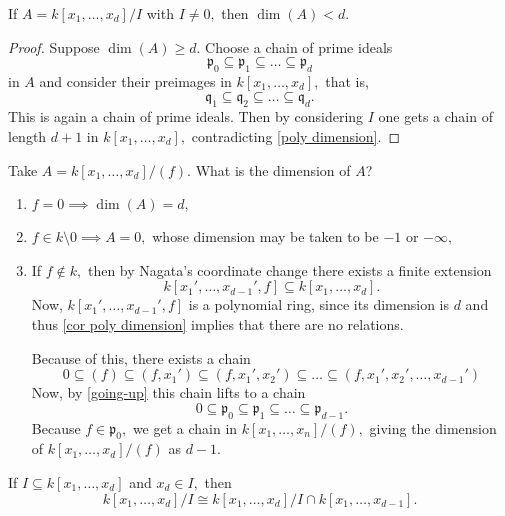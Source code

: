 \begin{corollary}
  \label{cor poly dimension}
  If
  \(A = k[x_1, \dotsc, x_d] /{I}\)
  with
  \(I \neq 0,\)
  then
  \(\dim(A) < d.\)
\end{corollary}
\begin{proof}
  Suppose
  \(\dim(A) \geq d.\)
  Choose a chain of prime ideals
  \[\mathfrak p_0 \subseteq \mathfrak p_1 \subseteq \dotso \subseteq \mathfrak p_d\]
  in \(A\) and consider their preimages in
  \(k[x_1, \dotsc, x_d],\)
  that is,
  \[\mathfrak q_1 \subseteq \mathfrak q_2 \subseteq \dotso \subseteq \mathfrak q_d.\]
  This is again a chain of prime ideals. Then by considering \(I\) one gets a chain of length
  \(d +1\)
  in \( k [x_1, \dotsc, x_d],\)
  contradicting \cref{poly dimension}.
\end{proof}

\begin{example}
  Take
  \(A = k[x_1, \dotsc, x_d]/{(f)}.\)
  What is the dimension of \(A\)?
  \begin{enumerate}
  \item \(f = 0  \implies \dim(A) = d,\)
  \item \(f \in k \setminus {0} \implies A = 0,\) whose dimension may be taken to be \(-1\) or \(-\infty,\)
  \item If \(f \notin k,\) then by Nagata's coordinate change there exists a finite extension
    \[k[x_1', \dotsc, x_{d-1}', f] \subseteq k[x_1, \dotsc, x_d].\]
    Now, \(k[x_1', \dotsc, x_{d-1}', f]\) is a polynomial ring, since its dimension is \(d\) and thus \cref{cor poly dimension} implies that there are no relations.

    Because of this, there exists a chain
    \[0 \subseteq (f) \subseteq (f, x_1') \subseteq (f, x_1', x_2') \subseteq \dotso \subseteq (f, x_1', x_2', \dotsc, x_{d-1}')\]
    Now, by \cref{going-up} this chain lifts to a chain
    \[0 \subseteq \mathfrak p_0 \subseteq \mathfrak p_1 \subseteq \dotso \subseteq \mathfrak p_{d-1}.\]
  Because \(f \in \mathfrak p_0,\)
  we get a chain in \(k[x_1, \dotsc, x_n]/{(f)},\)
  giving the dimension of
  \(k[x_1, \dotsc, x_d]/{(f)}\)
  as \(d-1.\) 
  \end{enumerate}
\end{example}

\begin{prop}
  If
  \(I \subseteq k[x_1, \dotsc, x_d]\)
  and \(x_d \in I,\)
  then
  \[k[x_1, \dotsc, x_d]/{I} \cong k[x_1, \dotsc, x_d]/{I \cap k[x_1, \dotsc, x_{d-1}]}.\]
\end{prop}



